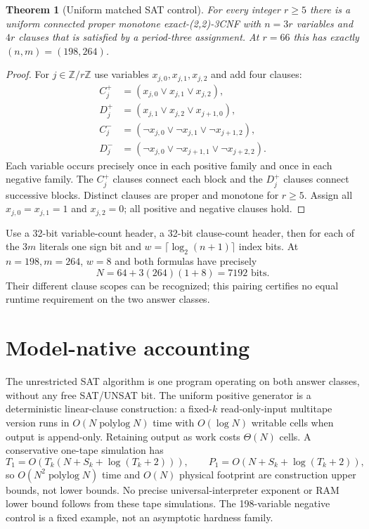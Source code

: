 \documentclass[11pt]{article}
\newtheorem{theorem}{Theorem}
\begin{document}
\begin{theorem}[Uniform matched SAT control]
For every integer $r\ge5$ there is a uniform connected proper
monotone exact-(2,2)-3CNF with $n=3r$ variables and $4r$ clauses
that is satisfied by a period-three assignment.
At $r=66$ this has exactly $(n,m)=(198,264)$.
\end{theorem}
\begin{proof}
For $j\in\mathbb Z/r\mathbb Z$ use variables $x_{j,0},x_{j,1},x_{j,2}$
and add four clauses:
\begin{align*}
C_j^+&=(x_{j,0}\vee x_{j,1}\vee x_{j,2}),\\
D_j^+&=(x_{j,1}\vee x_{j,2}\vee x_{j+1,0}),\\
C_j^-&=(\neg x_{j,0}\vee\neg x_{j,1}\vee\neg x_{j+1,2}),\\
D_j^-&=(\neg x_{j,0}\vee\neg x_{j+1,1}\vee\neg x_{j+2,2}).
\end{align*}
Each variable occurs precisely once in each positive family and once
in each negative family. The $C_j^+$ clauses connect each block and
the $D_j^+$ clauses connect successive blocks. Distinct clauses are
proper and monotone for $r\ge5$. Assign all $x_{j,0}=x_{j,1}=1$
and $x_{j,2}=0$; all positive and negative clauses hold.
\end{proof}

Use a 32-bit variable-count header, a 32-bit clause-count header,
then for each of the $3m$ literals one sign bit and
$w=\lceil\log_2(n+1)\rceil$ index bits. At $n=198,m=264$,
$w=8$ and both formulas have precisely
\[
N=64+3(264)(1+8)=\boxed{7192}\text{ bits}.
\]
Their different clause scopes can be recognized; this pairing
certifies no equal runtime requirement on the two answer classes.

\section{Model-native accounting}
The unrestricted SAT algorithm is one program operating on both
answer classes, without any free SAT/UNSAT bit.
The uniform positive generator is a deterministic linear-clause
construction: a fixed-$k$ read-only-input multitape version runs in
$O(N\operatorname{polylog}N)$ time with $O(\log N)$ writable cells
when output is append-only. Retaining output as work costs
$\Theta(N)$ cells. A conservative one-tape simulation has
\[
T_1=O(T_k(N+S_k+\log(T_k+2))),\qquad
P_1=O(N+S_k+\log(T_k+2)),
\]
so $O(N^2\operatorname{polylog}N)$ time and $O(N)$ physical
footprint are construction upper bounds, not lower bounds.
No precise universal-interpreter exponent or RAM lower bound
follows from these tape simulations. The 198-variable negative
control is a fixed example, not an asymptotic hardness family.
\end{document}
